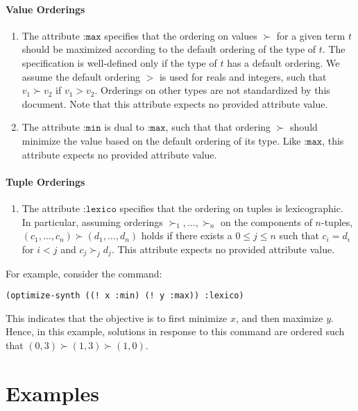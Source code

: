 \documentclass[english,a4paper,10pt]{article}
\begin{document}
\paragraph{Value Orderings}
\begin{enumerate}
\item The attribute $\texttt{:max}$ specifies that the ordering on values 
$\succ$ for a given term $t$ should be maximized according to the default ordering
of the type of $t$.
The specification is well-defined only if the type of $t$ has a default ordering.
We assume the default ordering $>$ is used for reals and integers, such that
$v_1 \succ v_2$ if $v_1 > v_2$.
Orderings on other types are not standardized by this document.
Note that this attribute expects no provided attribute value.
\item The attribute $\texttt{:min}$ is dual to $\texttt{:max}$, such that that ordering $\succ$
should minimize the value based on the default ordering of its type.
Like $\texttt{:max}$, this attribute expects no provided attribute value.
\end{enumerate}

\paragraph{Tuple Orderings}

\begin{enumerate}
\item The attribute $\texttt{:lexico}$ specifies that the ordering on tuples is lexicographic.
In particular, assuming orderings $\succ_1, \ldots, \succ_n$ on the components of $n$-tuples,
$(c_1, \ldots, c_n) \succ (d_1, \ldots, d_n)$ holds if there exists a $0 \leq j \leq n$
such that $c_i = d_i$ for $i<j$ and $c_j \succ_j d_j$.
This attribute expects no provided attribute value.
\end{enumerate}

\noindent
For example, consider the command:
\begin{lstlisting}[language=SyGuS-Desugar]
(optimize-synth ((! x :min) (! y :max)) :lexico)
\end{lstlisting}
This indicates that the objective is to first minimize $x$, and then maximize $y$.
Hence, in this example, solutions in response to this command are ordered such that
$(0,3) \succ (1,3) \succ (1,0)$.

\section{Examples}%
\label{sec:examples}
\end{document}
